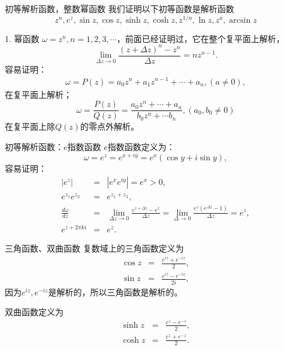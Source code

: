 \documentclass[11pt]{beamer}
\newcommand{\kong}[1][0.5]{\vspace{#1cm}}
\begin{document}
\begin{frame}{初等解析函数，整数幂函数}
我们证明以下初等函数是解析函数
\begin{equation}
z^n, e^z, \sin z, \cos z, \sinh z, \cosh z, z^{1/n}, \ln z, z^a, \arcsin z
\end{equation}

1. 幂函数 $\omega = z^n, n=1,2,3,\cdots$，前面已经证明过，它在整个复平面上解析，
\begin{equation}
\lim\limits_{\Delta z \rightarrow 0} \frac{ (z+\Delta z)^n - z^n}{\Delta z} = n z^{n-1}.
\end{equation}
容易证明：
\begin{eqnarray}
\omega = P(z) = a_0 z^n + a_1 z^{n-1} + \cdots + a_n, (a \neq 0),
\end{eqnarray}
在复平面上解析；
\begin{equation}
\omega = \frac{P(z)}{Q(z)} = \frac{a_0 z^n + \cdots + a_n}{b_0 z^n + \cdots b_n}, (a_0, b_0 \neq 0)
\end{equation}
在复平面上除$Q(z)$的零点外解析。
\end{frame}

\begin{frame}{初等解析函数：$e$指数函数}
$e$指数函数定义为：
\begin{equation}
\omega = e^z = e^{x+iy} = e^x(\cos y + i\sin y),
\end{equation}
容易证明：
\begin{eqnarray}
|e^z| &=& |e^x e^{iy}| = e^x >0, \\
e^{z_1} e^{z_2} &=& e^{z_1 + z_2}, \\
\frac{d\omega}{dz} &=& \lim\limits_{\Delta z \rightarrow 0}
\frac{ e^{z+\Delta z} - e^z}{\Delta z} = \lim\limits_{\Delta \rightarrow 0} \frac{ e^z(e^{\Delta z} -1) }{ \Delta z}
= e^z, \\
e^{z + 2\pi k i} &=& e^z.
\end{eqnarray}
\end{frame}

\begin{frame}{三角函数、双曲函数}
复数域上的三角函数定义为
\begin{eqnarray}
\cos z &=& \frac{e^{iz} + e^{-iz}}{2}, \\
\sin z &=& \frac{e^{iz} - e^{-iz}}{2i},
\end{eqnarray}
因为$e^{iz}, e^{-iz}$是解析的，所以三角函数是解析的。

\kong[0.5]
双曲函数定义为
\begin{eqnarray}
\sinh z &=& \frac{e^z - e^{-z}}{2}, \\
\cosh z &=& \frac{e^z + e^{-z}}{2}.
\end{eqnarray}
\end{frame}
\end{document}
